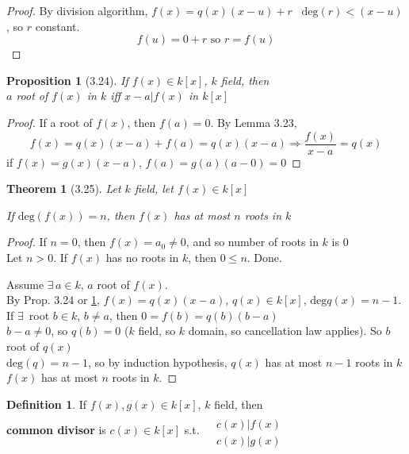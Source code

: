 \documentclass[twoside,landscape]{amsart}
\theoremstyle{plain}
\newtheorem{theorem}{Theorem}
\newtheorem{proposition}{Proposition}
\theoremstyle{definition}
\newtheorem{definition}{Definition}
\theoremstyle{remark}
\begin{document}
\begin{multicols*}{2}
\begin{proof}
  By division algorithm, $f(x) = q(x)(x-u) + r$ \quad \, $\text{deg}(r) < (x-u)$, so $r$ constant. 
\[
f(u) = 0 + r \text{ so } r = f(u)
\]
\end{proof}

\begin{proposition}[3.24]\label{Prop:3.24} If $f(x) \in k[x]$, $k$ field, then \\
$a$ root of $f(x)$ in $k$ iff $x-a | f(x)$ in $k[x]$
\end{proposition}

\begin{proof}
  If a root of $f(x)$, then $f(a) =0$.  By Lemma 3.23, 
\[
f(x) = q(x) (x-a) + f(a) = q(x)(x-a) \Longrightarrow \frac{f(x)}{x-a} =q(x)
\]
if $f(x) = g(x)(x-a)$, $f(a) = g(a)(a-0)=0$
\end{proof}

\begin{theorem}[3.25]
Let $k$ field, let $f(x) \in k[x]$

If $\text{deg}(f(x)) = n$, then $f(x)$ has at most $n$ roots in $k$
\end{theorem}

\begin{proof}
  If $n=0$, then $f(x)=a_0 \neq 0$, and so number of roots in $k$ is $0$ \\
Let $n> 0$. If $f(x)$ has no roots in $k$, then $0\leq n$. Done.  

Assume $\exists \, a \in k$, $a$ root of $f(x)$.  \\
\phantom{Assume} By Prop. 3.24 or \ref{Prop:3.24}, $f(x) = q(x)(x-a)$, $q(x) \in k[x]$, $\text{deg}q(x) = n-1$.  \\
\phantom{Assume By} If $\exists \, $ root $b\in k$, $b\neq a$, then $0=f(b)=  q(b)(b-a)$ \\
\phantom{Assume By} $b-a \neq 0$, so $q(b) =0$ ($k$ field, so $k$ domain, so cancellation law applies).  So $b$ root of $q(x)$ \\
\phantom{Assume By} $\text{deg}(q) =n-1$, so by induction hypothesis, $q(x)$ has at most $n-1$ roots in $k$\\
\phantom{Assume By} $f(x)$ has at most $n$ roots in $k$.  


\end{proof}


\begin{definition}
  If $f(x),g(x) \in k[x]$, $k$ field, then \\
\textbf{common divisor} is $c(x) \in k[x]$ s.t. $\begin{aligned} & \quad \\
  & c(x) | f(x) \\
  & c(x) | g(x) \end{aligned}$


\end{definition}
\end{multicols*}
\end{document}
